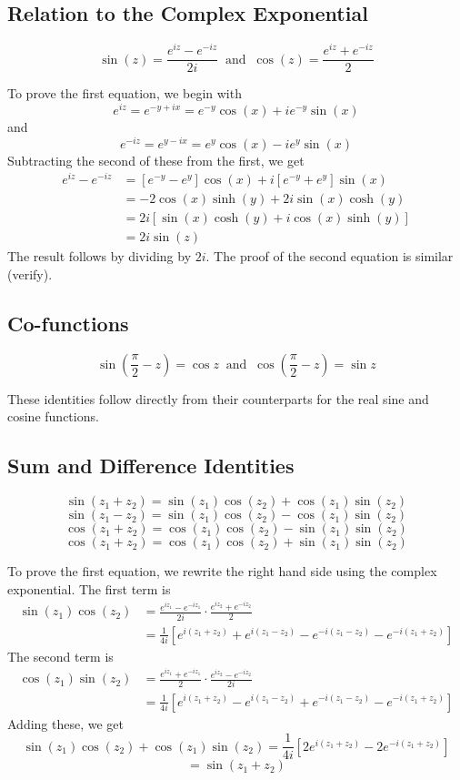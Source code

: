 \documentclass[handout]{ximera}
\begin{document}
\subsection{Relation to the Complex Exponential}
\begin{proposition}
\[
\sin(z) = \frac{e^{iz} - e^{-iz}}{2i} \;\; \mbox{and} \;\;  \cos(z) = \frac{e^{iz} + e^{-iz}}{2}
\]
\end{proposition}
To prove the first equation, we begin with
\[
e^{iz} = e^{-y+ix} = e^{-y}\cos(x) + ie^{-y}\sin(x)
\]
and
\[
e^{-iz} = e^{y-ix} = e^{y}\cos(x) - ie^{y}\sin(x)
\]
Subtracting the second of these from the first, we get
\begin{align*}
e^{iz} - e^{-iz} &= \left[e^{-y}-e^y\right]\cos(x) + i\left[e^{-y}+e^y\right]\sin(x)\\
&=-2\cos(x) \sinh(y) +2i \sin(x)\cosh(y)\\
& = 2i\left[\sin(x)\cosh(y) + i \cos(x)\sinh(y)\right]\\
&=2i\sin(z)
\end{align*}
The result follows by dividing by $2i$.
The proof of the second equation is similar (verify).


\subsection{Co-functions}
\begin{proposition}
\[
\sin\left(\frac{\pi}{2}-z\right) = \cos z \;\; \mbox{and} \;\; \cos\left(\frac{\pi}{2}-z\right) = \sin z
\]
\end{proposition}
These identities follow directly from their counterparts for the real sine and cosine functions.

\subsection{Sum and Difference Identities}
\begin{proposition}
\[
\sin(z_1 + z_2) = \sin(z_1)\cos(z_2) + \cos(z_1)\sin(z_2)
\]
\[
\sin(z_1 - z_2) = \sin(z_1)\cos(z_2) - \cos(z_1)\sin(z_2)
\]
\[
\cos(z_1 + z_2) = \cos(z_1)\cos(z_2) - \sin(z_1)\sin(z_2)
\]
\[
\cos(z_1 + z_2) = \cos(z_1)\cos(z_2) + \sin(z_1)\sin(z_2)
\]
\end{proposition}
To prove the first equation, we rewrite the right hand side using the complex exponential. The first term is
\begin{align*}
\sin(z_1)\cos(z_2) &= \frac{e^{iz_1} - e^{- iz_1}}{2i} \cdot \frac{e^{iz_2} + e^{-iz_2}}{2}\\
&= \frac{1}{4i}\left[e^{i(z_1+ z_2)} + e^{i(z_1 - z_2)} - e^{-i(z_1 - z_2)} - e^{-i(z_1+ z_2)}\right]
\end{align*}
The second term is
\begin{align*}
\cos(z_1)\sin(z_2) &= \frac{e^{iz_1} + e^{- iz_1}}{2} \cdot \frac{e^{iz_2} - e^{-iz_2}}{2i}\\
&= \frac{1}{4i}\left[e^{i(z_1+ z_2)} - e^{i(z_1 - z_2)} + e^{-i(z_1 - z_2)} - e^{-i(z_1+ z_2)}\right]
\end{align*}
Adding these, we get
\[
\sin(z_1)\cos(z_2) + \cos(z_1)\sin(z_2)  = \frac{1}{4i}\left[2e^{i(z_1+ z_2)} - 2e^{-i(z_1+ z_2)}\right]
\]
\[
= \sin(z_1 + z_2)
\]
\end{document}
